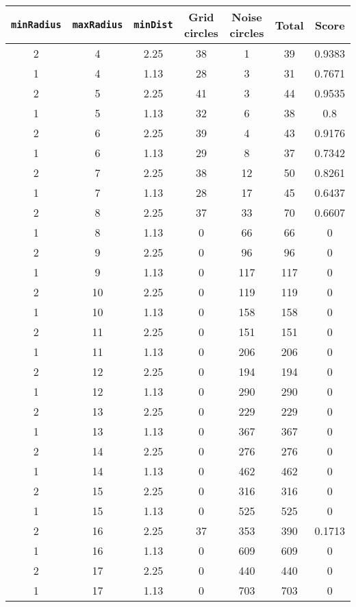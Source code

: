 \documentclass[letterpaper, 12pt]{article}
\begin{document}
\begin{longtable}{|c|c|c|c|c|c|c|}
\hline
\textbf{\texttt{minRadius}} & \textbf{\texttt{maxRadius}} & \textbf{\texttt{minDist}} & \textbf{Grid circles} & \textbf{Noise circles} & \textbf{Total} & \textbf{Score} \\
\hline
2 & 4 & 2.25 & 38 & 1 & 39 & 0.9383 \\
\hline
1 & 4 & 1.13 & 28 & 3 & 31 & 0.7671 \\
\hline
2 & 5 & 2.25 & 41 & 3 & 44 & 0.9535 \\
\hline
1 & 5 & 1.13 & 32 & 6 & 38 & 0.8 \\
\hline
2 & 6 & 2.25 & 39 & 4 & 43 & 0.9176 \\
\hline
1 & 6 & 1.13 & 29 & 8 & 37 & 0.7342 \\
\hline
2 & 7 & 2.25 & 38 & 12 & 50 & 0.8261 \\
\hline
1 & 7 & 1.13 & 28 & 17 & 45 & 0.6437 \\
\hline
2 & 8 & 2.25 & 37 & 33 & 70 & 0.6607 \\
\hline
1 & 8 & 1.13 & 0 & 66 & 66 & 0 \\
\hline
2 & 9 & 2.25 & 0 & 96 & 96 & 0 \\
\hline
1 & 9 & 1.13 & 0 & 117 & 117 & 0 \\
\hline
2 & 10 & 2.25 & 0 & 119 & 119 & 0 \\
\hline
1 & 10 & 1.13 & 0 & 158 & 158 & 0 \\
\hline
2 & 11 & 2.25 & 0 & 151 & 151 & 0 \\
\hline
1 & 11 & 1.13 & 0 & 206 & 206 & 0 \\
\hline
2 & 12 & 2.25 & 0 & 194 & 194 & 0 \\
\hline
1 & 12 & 1.13 & 0 & 290 & 290 & 0 \\
\hline
2 & 13 & 2.25 & 0 & 229 & 229 & 0 \\
\hline
1 & 13 & 1.13 & 0 & 367 & 367 & 0 \\
\hline
2 & 14 & 2.25 & 0 & 276 & 276 & 0 \\
\hline
1 & 14 & 1.13 & 0 & 462 & 462 & 0 \\
\hline
2 & 15 & 2.25 & 0 & 316 & 316 & 0 \\
\hline
1 & 15 & 1.13 & 0 & 525 & 525 & 0 \\
\hline
2 & 16 & 2.25 & 37 & 353 & 390 & 0.1713 \\
\hline
1 & 16 & 1.13 & 0 & 609 & 609 & 0 \\
\hline
2 & 17 & 2.25 & 0 & 440 & 440 & 0 \\
\hline
1 & 17 & 1.13 & 0 & 703 & 703 & 0 \\

\end{longtable}
\end{document}
